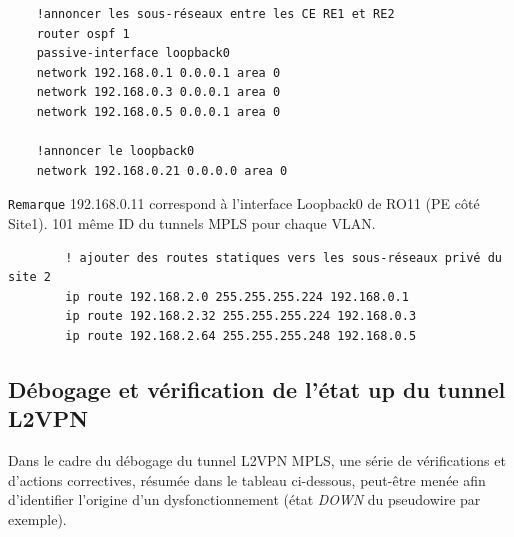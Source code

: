 \documentclass[12pt,a4paper, oneside]{memoir}
\begin{document}
\begin{enumerate}
\begin{verbatim}
	!annoncer les sous-réseaux entre les CE RE1 et RE2
	router ospf 1
	passive-interface loopback0
	network 192.168.0.1 0.0.0.1 area 0
	network 192.168.0.3 0.0.0.1 area 0
	network 192.168.0.5 0.0.0.1 area 0
	
	!annoncer le loopback0
	network 192.168.0.21 0.0.0.0 area 0
\end{verbatim}

\texttt{Remarque}
192.168.0.11 correspond à l’interface Loopback0 de RO11 (PE côté Site1).
101 même ID du tunnels MPLS pour chaque VLAN.

	\begin{verbatim}
		! ajouter des routes statiques vers les sous-réseaux privé du site 2
		ip route 192.168.2.0 255.255.255.224 192.168.0.1
		ip route 192.168.2.32 255.255.255.224 192.168.0.3
		ip route 192.168.2.64 255.255.255.248 192.168.0.5		
	\end{verbatim}
\end{enumerate}	

\subsection{Débogage et vérification de l'état up du tunnel L2VPN}

Dans le cadre du débogage du tunnel L2VPN MPLS, une série de vérifications et d’actions correctives, résumée dans le tableau ci-dessous, peut-être menée afin d’identifier l’origine d'un dysfonctionnement (état \textit{DOWN} du pseudowire par exemple). 
\vspace{0.5cm}
\end{document}
